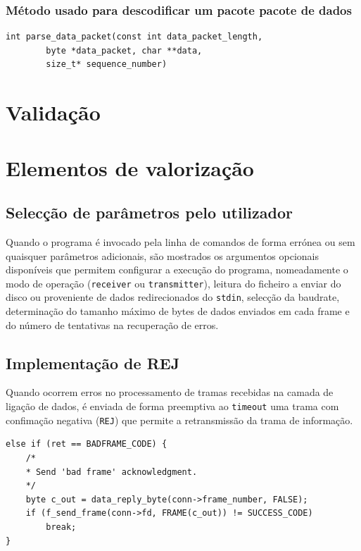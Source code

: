 \documentclass[a4paper,11pt,titlepage]{article}
\begin{document}
\subsubsection*{Método usado para descodificar um pacote pacote de dados}
\begin{lstlisting}[style=customc]
int parse_data_packet(const int data_packet_length,
		byte *data_packet, char **data,
		size_t* sequence_number)
\end{lstlisting}

\section{Validação}

\section{Elementos de valorização}

\subsection{Selecção de parâmetros pelo utilizador}
Quando o programa é invocado pela linha de comandos de forma errónea ou sem quaisquer parâmetros adicionais, são mostrados os argumentos opcionais disponíveis que permitem configurar a execução do programa, nomeadamente o modo de operação (\texttt{receiver} ou \texttt{transmitter}), leitura do ficheiro a enviar do disco ou proveniente de dados redirecionados do \texttt{stdin}, selecção da baudrate, determinação do tamanho máximo de bytes de dados enviados em cada frame e do número de tentativas na recuperação de erros. 

\subsection{Implementação de REJ}
Quando ocorrem erros no processamento de tramas recebidas na camada de ligação de dados, é enviada de forma preemptiva ao \texttt{timeout} uma trama com confimação negativa (\texttt{REJ}) que permite a retransmissão da trama de informação.

\begin{lstlisting}[style=customc]
else if (ret == BADFRAME_CODE) {
	/*
	* Send 'bad frame' acknowledgment.
	*/
	byte c_out = data_reply_byte(conn->frame_number, FALSE);
	if (f_send_frame(conn->fd, FRAME(c_out)) != SUCCESS_CODE)
		break;
}
\end{lstlisting}
\end{document}
